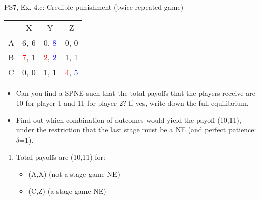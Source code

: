 \begin{frame}{PS7, Ex. 4.c: Credible punishment (twice-repeated game)}
    \vspace{-2pt}
    \begin{table}
      \begin{tabular}{l|c|c|c|}
        \multicolumn{1}{c}{} & \multicolumn{1}{c}{X} & \multicolumn{1}{c}{Y} & \multicolumn{1}{c}{Z}\\\cline{2-4}
        A   & 6, 6 &  0, \textcolor{blue}{8} &  0, 0  \\\cline{2-4}
        B & \textcolor{red}{7}, 1  & \textcolor{red}{2}, \textcolor{blue}{2} &  1, 1  \\\cline{2-4}
        C & 0, 0  & 1, 1 &  \textcolor{red}{4}, \textcolor{blue}{5}  \\\cline{2-4}
      \end{tabular}
    \end{table}
    \vspace{-4pt}
    \begin{itemize}
        \item[(c)] Can you find a SPNE such that the total payoffs that the players receive are 10 for player 1 and 11 for player 2? If yes, write down the full equilibrium.
    \end{itemize}
    \vspace{-8pt}
    \begin{multicols}{2}
      \begin{itemize}
        \item[(Step a)] Find out which combination of outcomes would yield the payoff (10,11), under the restriction that the last stage must be a NE (and perfect patience: $\delta$=1).
      \end{itemize}
      \vspace{-6pt}
      \vfill\null\columnbreak
      \begin{enumerate}
        \item[a.] Total payoffs are (10,11) for:
        \begin{itemize}\normalsize
          \item[t=1:] (A,X) (not a stage game NE)
          \item[t=2:] (C,Z) (a stage game NE)
        \end{itemize}
      \end{enumerate}
      \vfill\null
    \end{multicols}
\end{frame}

